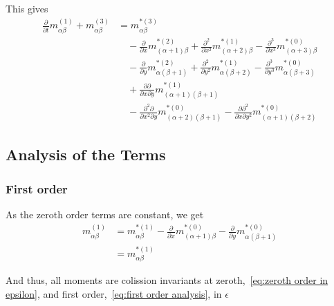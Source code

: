 \documentclass{article}
\begin{document}
This gives
\begin{equation}
  \label{eq:third order in epsilon}
  \begin{aligned}
    \frac{\partial}{\partial t} m_{\alpha\beta}^{(1)} + m_{\alpha\beta}^{(3)}
    & =  m_{\alpha\beta}^{*(3)} \\
    &\quad - \frac{\partial}{\partial x} m_{(\alpha+1)\beta}^{*(2)} + \frac{\partial^2}{\partial x^2} m_{(\alpha+2)\beta}^{*(1)} - \frac{\partial^3}{\partial x^3} m_{(\alpha+3)\beta}^{*(0)} \\
    &\quad - \frac{\partial}{\partial y} m_{\alpha(\beta+1)}^{*(2)} + \frac{\partial^2}{\partial y^2} m_{\alpha(\beta+2)}^{*(1)} - \frac{\partial^3}{\partial y^3} m_{\alpha(\beta+3)}^{*(0)} \\
    &\quad + \frac{\partial\partial}{\partial x \partial y} m_{(\alpha+1)(\beta+1)}^{*(1)} \\
    &\quad - \frac{\partial^2\partial}{\partial x^2 \partial y} m_{(\alpha+2)(\beta+1)}^{*(0)} - \frac{\partial\partial^2}{\partial x \partial y^2} m_{(\alpha+1)(\beta+2)}^{*(0)}
  \end{aligned}
\end{equation}

\subsection{Analysis of the Terms}
\label{sub:Analysis of the Terms}

\subsubsection{First order}
\label{subs:First order}
As the zeroth order terms are constant, we get
\begin{equation}
  \label{eq:first order analysis}
  \begin{aligned}
    m_{\alpha\beta}^{(1)}
    & = m_{\alpha\beta}^{*(1)}
    - \frac{\partial}{\partial x} m_{(\alpha+1)\beta}^{*(0)}
    - \frac{\partial}{\partial y} m_{\alpha(\beta+1)}^{*(0)} \\
    & = m_{\alpha\beta}^{*(1)}
  \end{aligned}
\end{equation}

And thus, all moments are colission invariants at zeroth,~\eqref{eq:zeroth order in epsilon}, and first order,~\eqref{eq:first order analysis}, in $\epsilon$
\end{document}

